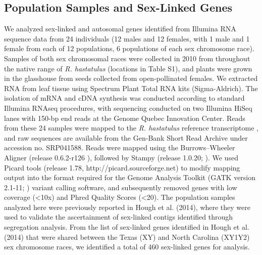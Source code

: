 \documentclass[9pt,twocolumn,twoside]{gsajnl}
\begin{document}
\subsection*{Population Samples and Sex-Linked Genes}
We analyzed sex-linked and autosomal genes identified from Illumina RNA sequence data from 24 individuals (12 males and 12 females, with 1 male and 1 female from each of 12 populations, 6 populations of each sex chromosome race). Samples of both sex chromosomal races were collected in 2010 from throughout the native range of \textit{R. hastatulus} (locations in Table S1), and plants were grown in the glasshouse from seeds collected from open-pollinated females. We extracted RNA from leaf tissue using Spectrum Plant Total RNA kits (Sigma-Aldrich). The isolation of mRNA and cDNA synthesis was conducted according to standard Illumina RNAseq procedures, with sequencing conducted on two Illumina HiSeq lanes with 150-bp end reads at the Genome Quebec Innovation Center. Reads from these 24 samples were mapped to the \textit{R. hastatulus} reference transcriptome \citep{hough2014}, and raw sequences are available from the Gen-Bank Short Read Archive under accession no. SRP041588. Reads were mapped using the Burrows–Wheeler Aligner (release 0.6.2-r126 \citep{li2010fast}), followed by Stampy (release 1.0.20; \citep{lunter2011stampy}). We used Picard tools (release 1.78, http://picard.sourceforge.net) to modify mapping output into the format required for the Genome Analysis Toolkit (GATK version 2.1-11; \citep{mckenna2010genome}) variant calling software, and subsequently removed genes with low coverage (<10x) and Phred Quality Scores (<20). The population samples analyzed here were previously reported in Hough et al. (2014), where they were used to validate the ascertainment of sex-linked contigs identified through segregation analysis. From the list of sex-linked genes identified in Hough et al. (2014) that were shared between the Texas (XY) and North Carolina (XY1Y2) sex chromosome races, we identified a total of 460 sex-linked genes for analysis.
\end{document}
